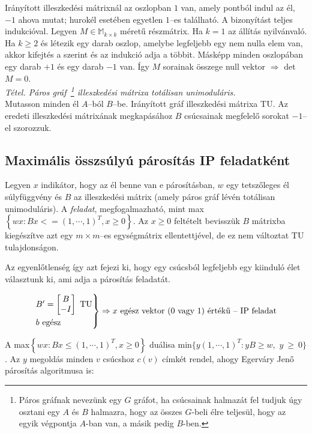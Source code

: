 Irányított illeszkedési mátrixnál az oszlopban $1$ van, amely pontból indul az
él, $-1$ ahova mutat; hurokél esetében egyetlen $1$--es található. A
bizonyítást teljes indukcióval. Legyen $M \in \mathbb{M}_{k\times k}$ méretű
részmátrix. Ha $k=1$ az állítás nyilvánvaló. Ha $k \geq 2$ és létezik egy darab
oszlop, amelybe legfeljebb egy nem nulla elem van, akkor kifejtés a szerint és az
indukció adja a többit. Másképp minden oszlopában egy darab $+1$ és egy darab
$-1$ van. Így $M$ sorainak összege null vektor $\Rightarrow$ det$M=0$.\\

\emph{Tétel. Páros gráf~\footnote{Páros gráfnak nevezünk egy $G$ gráfot, ha
csúcsainak halmazát fel tudjuk úgy osztani egy $A$ és $B$ halmazra, hogy az
összes $G$-beli élre teljesül, hogy az egyik végpontja $A$-ban van, a másik
pedig $B$-ben.} illeszkedési mátrixa totálisan unimoduláris.}\\ 

Mutasson minden él $A$--ból $B$--be. Irányított gráf illeszkedési mátrixa TU. Az
eredeti illeszkedési mátrixának megkapásához $B$ csúcsainak megfelelő sorokat
$-1$--el szorozzuk.

\subsection{Maximális összsúlyú párosítás IP feladatként}

Legyen $x$ indikátor, hogy az él benne van e párosításban, $w$ egy tetszőleges
él súlyfüggvény és $B$ az illeszkedési mátrix (amely páros gráf lévén totálisan
unimoduláris). A \emph{feladat}, megfogalmazható, mint max$\left\{ wx:Bx <= (1,
\cdots, 1)^T, x \geq 0 \right\}$. Az $x \geq 0 $ feltételt bevisszük $B$
mátrixba kiegészítve azt egy $m \times m$--es egységmátrix ellentettjével, de ez
nem változtat TU tulajdonságon. 

Az egyenlőtlenség így azt fejezi ki, hogy egy csúcsból legfeljebb egy kiinduló
élet választunk ki, ami adja a párosítás feladatát. 

\[
\begin{rcases}
B'=\begin{bmatrix} B \\ -I \end{bmatrix} \text{ TU} \\
b \text{ egész}
\end{rcases} \Rightarrow x \text{ egész vektor ($0$ vagy $1$) értékű -- IP feladat}
\]

A max$\left\{ wx : Bx \leq (1,\cdots,1)^T, x \geq 0 \right\}$ duálisa
min$\{ y(1,\cdots,1)^T : yB \geq w,$ $y~\geq~0\}$. Az $y$ megoldás
minden $v$ csúcshoz $c(v)$ címkét rendel, ahogy Egerváry Jenő párosítás
algoritmusa is:

